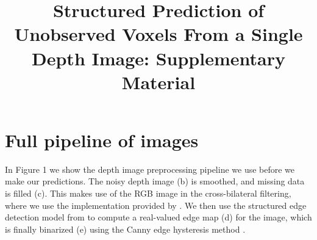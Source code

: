 \documentclass[10pt,onecolumn,letterpaper]{article}
\title{Structured Prediction of Unobserved Voxels From a Single Depth Image: Supplementary Material}
\begin{document}
\maketitle


\section{Full pipeline of images}


In Figure 1 we show the depth image preprocessing pipeline we use before we make our predictions.
The noisy depth image (b) is smoothed, and missing data is filled (c). 
This makes use of the RGB image in the cross-bilateral filtering, where we use the implementation provided by \cite{silberman-eccv-2012}.
We then use the structured edge detection model from \cite{dollar-iccv-2013} to compute a real-valued edge map (d) for the image, which is finally binarized (e) using the Canny edge hysteresis method \cite{canny-pami-1986}.
\newcommand{\preprocesssubwidth}{0.3\columnwidth}
\end{document}
